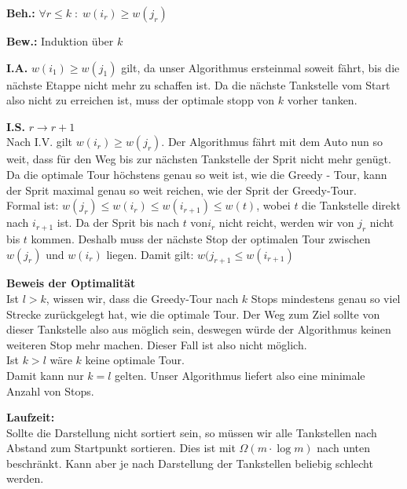 \documentclass[11pt,a4paper,ngerman]{article}
\begin{document}
\begin{description}

\item{\bfseries Beh.:} $\forall r \leq k \; : \; w(i_r) \geq w(j_r)$

\item{\bfseries Bew.:} Induktion über $k$

\item{\bfseries I.A.} $w(i_1) \geq w(j_1)$ gilt, da unser Algorithmus ersteinmal soweit fährt, bis die nächste Etappe nicht mehr zu schaffen ist. Da die nächste Tankstelle vom Start also nicht zu erreichen ist, muss der optimale stopp von $k$ vorher tanken.

\item{\bfseries I.S.} $r \longrightarrow r + 1$\\
Nach I.V. gilt $w(i_r) \geq w(j_r)$. Der Algorithmus fährt mit dem Auto nun so weit, dass für den Weg bis zur nächsten Tankstelle der Sprit nicht mehr genügt.\\
Da die optimale Tour höchstens genau so weit ist, wie die Greedy - Tour, kann der Sprit maximal genau so weit reichen, wie der Sprit der Greedy-Tour.\\

Formal ist: $w(j_r) \leq w(i_r) \leq w(i_{r+1}) \leq w(t)$, wobei $t$ die Tankstelle direkt nach $i_{r+1}$ ist. Da der Sprit bis nach $t$ von$i_r$ nicht reicht, werden wir von $j_r$ nicht bis $t$ kommen. Deshalb muss der nächste Stop der optimalen Tour zwischen $w(j_r)$ und $w(i_r)$ liegen. Damit gilt: $w(j_{r+1} \leq w(i_{r+1})$

\item{\bfseries Beweis der Optimalität}\\
Ist $l > k$, wissen wir, dass die Greedy-Tour nach $k$ Stops mindestens genau so viel Strecke zurückgelegt hat, wie die optimale Tour. Der Weg zum Ziel sollte von dieser Tankstelle also aus möglich sein, deswegen würde der Algorithmus keinen weiteren Stop mehr machen. Dieser Fall ist also nicht möglich.\\

Ist $k > l$ wäre $k$ keine optimale Tour.\\

Damit kann nur $k =l$ gelten. Unser Algorithmus liefert also eine minimale Anzahl von Stops.
\end{description}

\textbf{Laufzeit:}\\

Sollte die Darstellung nicht sortiert sein, so müssen wir alle Tankstellen nach Abstand zum Startpunkt sortieren. Dies ist mit $\Omega (m \cdot \log m)$ nach unten beschränkt. Kann aber je nach Darstellung der Tankstellen beliebig schlecht werden.\\
\end{document}
